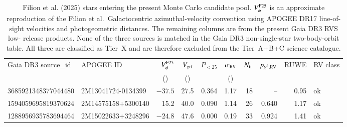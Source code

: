 \begin{table}
\caption{Filion et al. (2025) stars entering the present Monte Carlo candidate
pool.  $V_\phi^{\rm F25}$ is an approximate reproduction of the Filion et al.\
Galactocentric azimuthal-velocity convention using APOGEE DR17 line-of-sight
velocities and \citet{BailerJones2021} photogeometric distances.  The remaining
columns are from the present Gaia DR3 RVS low-\vgrf{} release products.  None of
the three sources is matched in the Gaia DR3 non-single-star two-body-orbit
table.  All three are classified as Tier~X and are therefore excluded from the
Tier~A+B+C science catalogue.}
\label{tab:filion2025_comparison}
\centering
\small
\setlength{\tabcolsep}{5pt}
\begin{tabular}{llrrrrrrrl}
\hline\hline
Gaia DR3 source\_id & APOGEE ID & $V_\phi^{\rm F25}$ & $V_{\mathrm{grf}}$ & $P_{<25}$ & $\sigma_{\rm RV}$ & $N_{\rm tr}$ & $p_{\chi^2,{\rm RV}}$ & RUWE & RV class \\
 & & \multicolumn{1}{c}{(\kms)} & \multicolumn{1}{c}{(\kms)} & & \multicolumn{1}{c}{(\kms)} & & & & \\
\hline
3685921348377044480 & 2M13041724-0134399 & $-37.5$ & 27.5 & 0.364 & 1.17 & 18 & -- & 0.95 & ok \\
1594059695819370624 & 2M14575158+5300140 & 15.2 & 40.0 & 0.090 & 1.14 & 26 & 0.640 & 1.17 & ok \\
1288956935783694464 & 2M15022633+3248296 & $-24.8$ & 47.6 & 0.000 & 0.19 & 33 & 0.924 & 1.41 & ok \\
\hline
\end{tabular}
\end{table}

